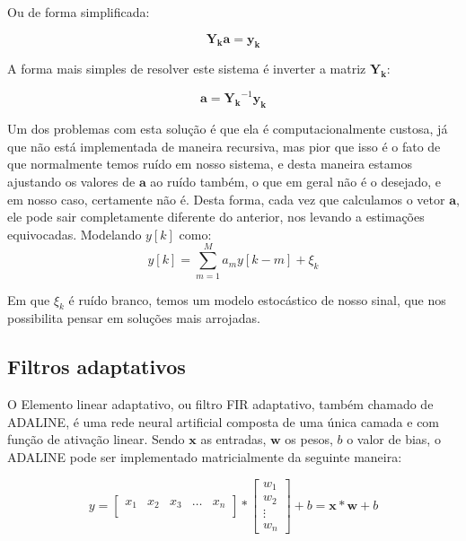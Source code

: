 \documentclass[a4paper, 12pt]{book}
\begin{document}
Ou de forma simplificada:

\begin{equation}
\boldsymbol{Y_k}\boldsymbol{a}=\boldsymbol{y_k}
\end{equation}

A forma mais simples de resolver este sistema é inverter a matriz $\boldsymbol{Y_k}$:

\begin{equation}
\boldsymbol{a}=\boldsymbol{Y_k}^{-1}\boldsymbol{y_k}
\end{equation}

Um dos problemas com esta solução é que ela é computacionalmente custosa, já  que não está implementada de maneira recursiva, mas pior que isso é o fato de que normalmente temos ruído em nosso sistema, e desta maneira estamos ajustando os valores de $\boldsymbol{a}$ ao ruído também, o que em geral não é o desejado, e em nosso caso, certamente não é. Desta forma, cada vez que calculamos o vetor $\boldsymbol{a}$, ele pode sair completamente diferente do anterior, nos levando a estimações equivocadas. Modelando $y[k]$ como:
\begin{equation}
y[k]=\sum_{m=1}^{M}a_m y[k-m]+\xi_k
\end{equation}

Em que $\xi_k$ é ruído branco, temos um modelo estocástico de nosso sinal, que nos possibilita pensar em soluções mais arrojadas. 

\subsection{Filtros adaptativos}

\indent O Elemento linear adaptativo, ou filtro FIR adaptativo, também chamado de ADALINE, é uma rede neural artificial composta de uma única camada e com função de ativação linear. Sendo $\boldsymbol{x}$ as entradas, $\boldsymbol{w}$ os pesos, $b$ o valor de bias, o ADALINE pode ser implementado matricialmente da seguinte maneira:


\begin{equation}
y=
\begin{bmatrix}
x_{1} & x_{2} & x_{3} & \dots & x_{n} \\
\end{bmatrix}
*
\begin{bmatrix}
w_{1}  \\
w_{2}  \\
\vdots  \\
w_{n} 
\end{bmatrix}
+ b = \boldsymbol{x}*\boldsymbol{w}+b
\end{equation}
\end{document}
